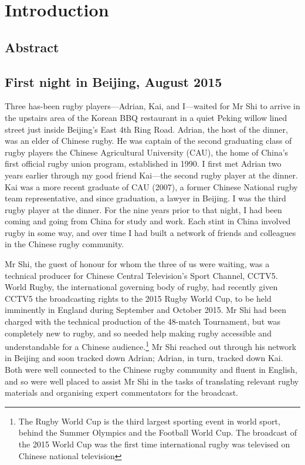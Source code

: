 \chapter{\label{introduction}Introduction}



\minitoc


\section{Abstract}


\section{First night in Beijing, August 2015}

Three has-been rugby players---Adrian, Kai, and I---waited for Mr Shi to arrive in the upstairs area of the Korean BBQ restaurant in a quiet Peking willow lined street just inside Beijing's East 4th Ring Road.  Adrian, the host of the dinner, was an elder of Chinese rugby.  He was captain of the second graduating class of rugby players the Chinese Agricultural University (CAU), the home of China's first official rugby union program, established in 1990.  I first met Adrian two years earlier through my good friend Kai---the second rugby player at the dinner.  Kai was a more recent graduate of CAU (2007), a former Chinese National rugby team representative, and since graduation, a lawyer in Beijing.  I was the third rugby player at the dinner.  For the nine years prior to that night, I had been coming and going from China for study and work.  Each stint in China involved rugby in some way, and over time I had built a network of friends and colleagues in the Chinese rugby community.

Mr Shi, the guest of honour for whom the three of us were waiting, was a technical producer for Chinese Central Television's Sport Channel, CCTV5.  World Rugby, the international governing body of rugby, had recently given CCTV5 the broadcasting rights to the 2015 Rugby World Cup, to be held imminently in England during September and October 2015.  Mr Shi had been charged with the technical production of the 48-match Tournament, but was completely new to rugby, and so needed help making rugby accessible and understandable for a Chinese audience.\footnote{The Rugby World Cup is the third largest sporting event in world sport, behind the Summer Olympics and the Football World Cup. The broadcast of the 2015 World Cup was the first time international rugby was televised on Chinese national television}  Mr Shi reached out through his network in Beijing and soon tracked down Adrian; Adrian, in turn, tracked down Kai.  Both were well connected to the Chinese rugby community and fluent in English, and so were well placed to assist Mr Shi in the tasks of translating relevant rugby materials and organising expert commentators for the broadcast.

